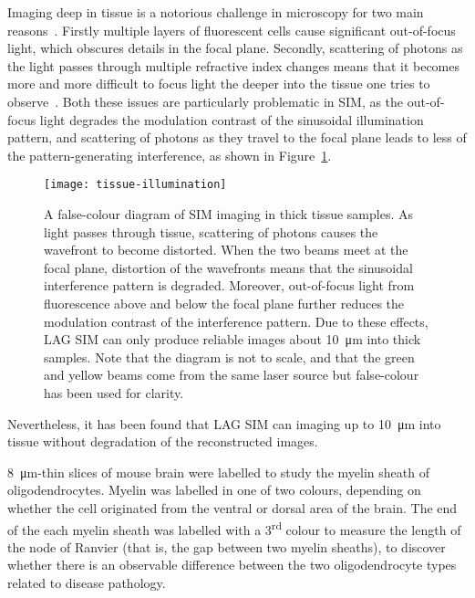 Imaging deep in tissue is a notorious challenge in microscopy for two main reasons~\cite{wimmer2010high}. 
Firstly multiple layers of fluorescent cells cause significant out-of-focus light, which obscures details in the focal plane.
Secondly, scattering of photons as the light passes through multiple refractive index changes means that it becomes more and more difficult to focus light the deeper into the tissue one tries to observe~\cite{jacques2013optical}. 
Both these issues are particularly problematic in SIM, as the out-of-focus light degrades the modulation contrast of the sinusoidal illumination pattern, and scattering of photons as they travel to the focal plane leads to less of the pattern-generating interference, as shown in Figure~\ref{fig:tissue-illumination}. 

\begin{figure}[htbp!]
\centering
\texttt{[image: tissue-illumination]}
\caption[LAG SIM: Imaging in tissue degrades the SIM pattern]{A false-colour diagram of SIM imaging in thick tissue samples. 
As light passes through tissue, scattering of photons causes the wavefront to become distorted. When the two beams meet at the focal plane, distortion of the wavefronts means that the sinusoidal interference pattern is degraded. Moreover, out-of-focus light from fluorescence above and below the focal plane further reduces the modulation contrast of the interference pattern. Due to these effects, LAG SIM can only produce reliable images about \SI{10}{\micro\metre} into thick samples. Note that the diagram is not to scale, and that the green and yellow beams come from the same laser source but false-colour has been used for clarity. }
\label{fig:tissue-illumination}
\end{figure}

Nevertheless, it has been found that LAG SIM can imaging up to \SI{10}{\micro\metre} into tissue without degradation of the reconstructed images. 

\SI{8}{\micro\metre}-thin slices of mouse brain were labelled to study the myelin sheath of oligodendrocytes. 
Myelin was labelled in one of two colours, depending on whether the cell originated from the ventral or dorsal area of the brain. 
The end of the each myelin sheath was labelled with a 3\textsuperscript{rd} colour to measure the length of the node of Ranvier (that is, the gap between two myelin sheaths), to discover whether there is an observable difference between the two oligodendrocyte types related to disease pathology. 

